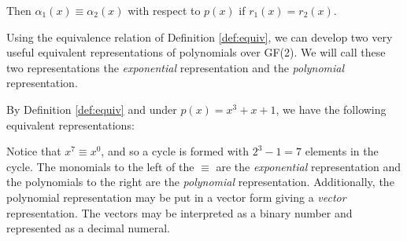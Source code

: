 {\begin{definition}
Then $\alpha_1(x)\equiv \alpha_2(x)$ with respect to $p(x)$ if $r_1(x)=r_2(x)$. 
\end{definition}

Using the equivalence relation of Definition \ref{def:equiv},
we can develop two very useful equivalent representations of
polynomials over GF(2).  
We will call these two representations the {\em exponential} representation
and the {\em polynomial} representation.

\begin{example}
\label{ex:representations}
By Definition \ref{def:equiv} and 
under $p(x)=x^3+x+1$, we have the following equivalent representations:

Notice that $x^7\equiv x^0$, and so a cycle is formed with 
$2^3-1=7$ elements in the cycle.
The monomials to the left of the $\equiv$ are the {\em exponential} 
representation and the polynomials to the right are the {\em polynomial}
representation.
Additionally, the polynomial representation may be put in a vector form giving a 
{\em vector} representation.
The vectors may be interpreted as a binary number and represented as a decimal numeral.
\end{example}

}
